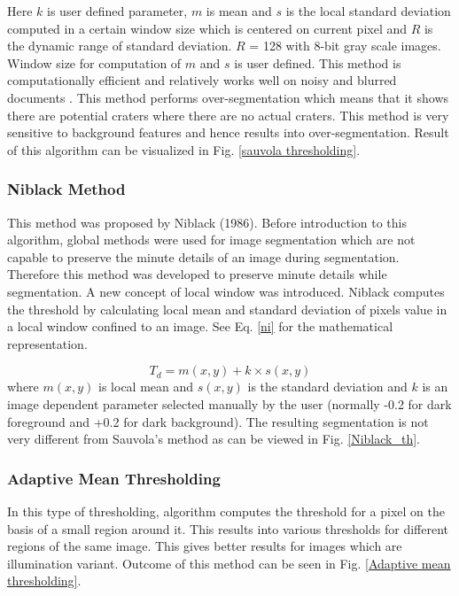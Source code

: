 \documentclass[11pt]{article}
\begin{document}
Here $k$ is user defined parameter, $m$ is mean and $s$ is the local standard deviation computed in a certain window size which is centered on current pixel and $R$ is the dynamic range of standard deviation. $R$ = 128 with 8-bit gray scale images. Window size for computation of $m$ and $s$ is user defined. This method is computationally efficient and relatively works well on noisy and blurred documents \cite{szegedy_going_2015}. This method performs over-segmentation which means that it shows there are potential craters where there are no actual craters. This method is very sensitive to background features and hence results into over-segmentation. Result of this algorithm can be visualized in Fig. \ref{sauvola thresholding}.

\subsubsection{Niblack Method}
This method was proposed by Niblack (1986). Before introduction to this algorithm, global methods were used for image segmentation which are not capable to preserve the minute details of an image during segmentation. Therefore this method was developed to preserve minute details while segmentation. A new concept of local window was introduced. Niblack computes the threshold by calculating local mean and standard deviation of pixels value in a local window confined to an image. See Eq. \ref{ni} for the mathematical representation.

\begin{equation}
T_{d}=m(x, y)+k \times s(x, y)
\label{ni}
\end{equation}
where $m(x, y)$ is local mean and $s(x, y)$ is the standard deviation and $k$ is an image dependent parameter selected manually by the user (normally -0.2 for dark foreground and +0.2 for dark background). The resulting segmentation is not very different from Sauvola's method as can be viewed in Fig. \ref{Niblack_th}.

\subsubsection{Adaptive Mean Thresholding}
In this type of thresholding, algorithm computes the threshold for a pixel on the basis of a small region around it. This results into various thresholds for different regions of the same image. This gives better results for images which are illumination variant. Outcome of this method can be seen in Fig. \ref{Adaptive mean thresholding}.
\end{document}
